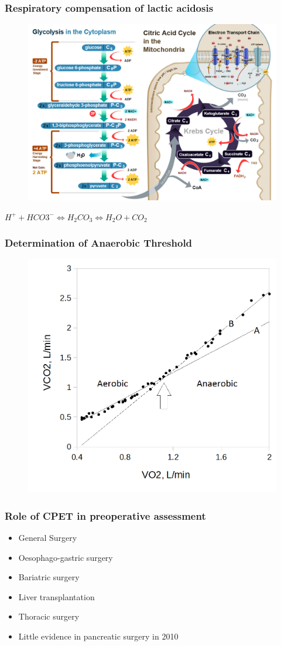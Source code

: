 \documentclass{beamer}
\begin{document}
\begin{frame}
	\frametitle{Respiratory compensation of lactic acidosis} 
	\begin{figure}
		\centering
		\includegraphics[width=0.7\linewidth]{CellRespiration}
		\label{fig:CellRespiration}
	\end{figure}
	\centering
	$H^+ + HCO3^- \Longleftrightarrow H_2CO_3 \Longleftrightarrow H_2O + CO_2$
		
	

\end{frame}

\begin{frame}
	\frametitle{Determination of Anaerobic Threshold}
	\begin{figure}[htbp]
		\centering
		\includegraphics[width=0.7\linewidth]{../Figures/cpet_vslope}
		\label{fig:cpet_vslope}
	\end{figure}
\end{frame}

\begin{frame}
	\frametitle{Role of CPET in preoperative assessment}
	\begin{itemize}
		\item General Surgery
		\item Oesophago-gastric surgery
		\item Bariatric surgery
		\item Liver transplantation
		\item Thoracic surgery
		\medskip
		\item Little evidence in pancreatic surgery in 2010
		
	\end{itemize}
\end{frame}
\end{document}
